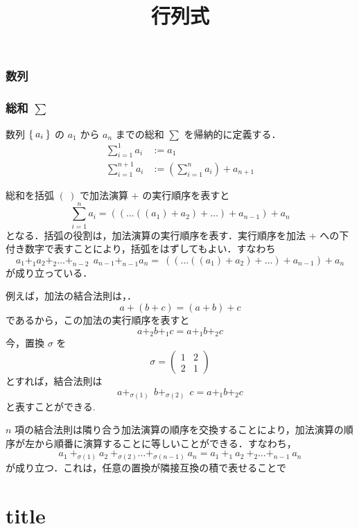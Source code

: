 \documentclass[leqno,autodetect-engine, dvipdfmx-if-dvi,ja=standard]{bxjsarticle}
\title{行列式}
\begin{document}
	
	\section{数列}
	
	\section{総和 $\sum$}
	
		\begin{dfn}[総和] 数列 $\Set{a_i}$ の $a_1$ から $a_n$ までの総和 $\sum$ を帰納的に定義する．
			\begin{align}
				\sum_{i=1}^{1} a_{i} &:= a_1 \\
				\sum_{i=1}^{n+1} a_i &:= \left( \sum_{i=1}^{n} a_i \right) + a_{n+1}
			\end{align}
		\end{dfn}
	
		\begin{eg} 総和を括弧 $( \  )$ で加法演算 $+$ の実行順序を表すと
			\begin{equation}
				\sum_{i=1}^n a_i = ((\dots((a_1) + a_2)+ \dots )+ a_{n-1}) + a_n
			\end{equation}
			となる．括弧の役割は，加法演算の実行順序を表す．実行順序を加法 $+$ への下付き数字で表すことにより，括弧をはずしてもよい．すなわち
			\begin{equation}
				a_1 +_{1} a_2 +_{2} \dots +_{n-2} \ \ a_{n-1} +_{n-1} a_n = \ ((\dots((a_1) + a_2)+ \dots )+ a_{n-1}) + a_n
			\end{equation}
			が成り立っている．
			
			例えば，加法の結合法則は，．
			\begin{equation}
				a + (b + c) = (a + b) + c
			\end{equation}
			であるから，この加法の実行順序を表すと
			\begin{equation} 
				a +_2 b +_1 c= a +_1 b +_2 c
			\end{equation}
			今，置換 $\sigma$ を
			\begin{equation}
				\sigma = 
				\begin{pmatrix}
					1 & 2 \\
					2 & 1 
				\end{pmatrix}
			\end{equation}
			とすれば，結合法則は
			\begin{equation} 
				a +_{\sigma(1)} \ \ b +_{\sigma(2)} \ \ c= a +_1 b +_2 c
			\end{equation}
			と表すことができる.
			
			$n$ 項の結合法則は隣り合う加法演算の順序を交換することにより，加法演算の順序が左から順番に演算することに等しいことができる．すなわち，
			\begin{equation}
				a_1 \ +_{\sigma(1)} \ a_2 \ +_{\sigma(2)}  \dots +_{\sigma(n-1)} \ a_n = a_1 \ +_1 \ a_2 \ +_2 \dots +_{n-1} \ a_n 
			\end{equation}
			が成り立つ．これは，任意の置換が隣接互換の積で表せることで\part{title}
		\end{eg}
	
\end{document}
